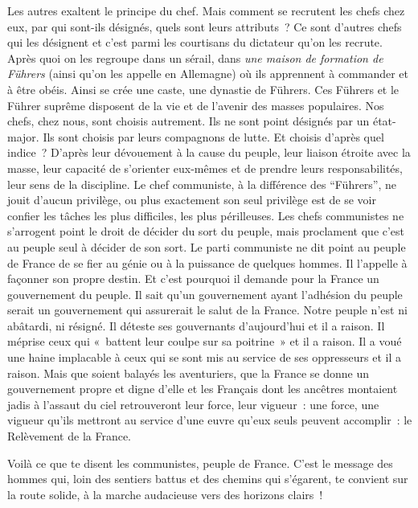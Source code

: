 \documentclass[french,twoside]{book} %
\newcommand{\dateline}[1]{\medskip{\RaggedLeft{#1}\par}\bigskip}
\newcommand\chapterclose{} %
\begin{document}
Les autres exaltent le principe du chef. Mais comment se recrutent les chefs chez eux, par qui sont-ils désignés, quels sont leurs attributs ? Ce sont d’autres chefs qui les désignent et c’est parmi les courtisans du dictateur qu’on les recrute. Après quoi on les regroupe dans un sérail, dans \emph{une maison de formation de Führers} (ainsi qu’on les appelle en Allemagne) où ils apprennent à commander et à être obéis. Ainsi se crée une caste, une dynastie de Führers. Ces Führers et le Führer suprême disposent de la vie et de l’avenir des masses populaires. Nos chefs, chez nous, sont choisis autrement. Ils ne sont point désignés par un état-major. Ils sont choisis par leurs compagnons de lutte. Et choisis d’après quel indice ? D’après leur dévouement à la cause du peuple, leur liaison étroite avec la masse, leur capacité de s’orienter eux-mêmes et de prendre leurs responsabilités, leur sens de la discipline. Le chef communiste, à la différence des “Führers”, ne jouit d’aucun privilège, ou plus exactement son seul privilège est de se voir confier les tâches les plus difficiles, les plus périlleuses. Les chefs communistes ne s’arrogent point le droit de décider du sort du peuple, mais proclament que c’est au peuple seul à décider de son sort. Le parti communiste ne dit point au peuple de France de se fier au génie ou à la puissance de quelques hommes. Il l’appelle à façonner son propre destin. Et c’est pourquoi il demande pour la France un gouvernement du peuple. Il sait qu’un gouvernement ayant l’adhésion du peuple serait un gouvernement qui assurerait le salut de la France. Notre peuple n’est ni abâtardi, ni résigné. Il déteste ses gouvernants d’aujourd’hui et il a raison. Il méprise ceux qui « battent leur coulpe sur sa poitrine » et il a raison. Il a voué une haine implacable à ceux qui se sont mis au service de ses oppresseurs et il a raison. Mais que soient balayés les aventuriers, que la France se donne un gouvernement propre et digne d’elle et les Français dont les ancêtres montaient jadis à l’assaut du ciel retrouveront leur force, leur vigueur : une force, une vigueur qu’ils mettront au service d’une euvre qu’eux seuls peuvent accomplir : le Relèvement de la France.\par
Voilà ce que te disent les communistes, peuple de France. C’est le message des hommes qui, loin des sentiers battus et des chemins qui s’égarent, te convient sur la route solide, à la marche audacieuse vers des horizons clairs !\par

\dateline{Fin avril 1941, Paris.}
\chapterclose
\end{document}
